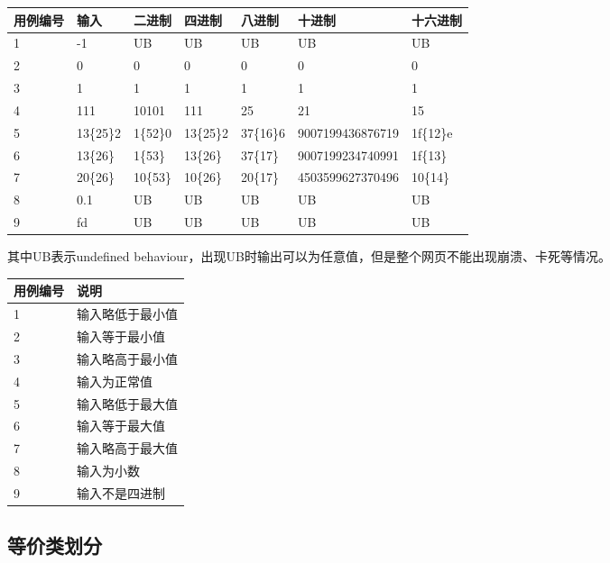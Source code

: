 \documentclass[12pt, a4paper, oneside]{ctexart}
\begin{document}
\begin{table}
\begin{tabular}{|l|l|l|l|l|l|l|}
\hline
用例编号 & 输入 & 二进制 & 四进制 & 八进制 & 十进制 & 十六进制\\ \hline
1 & -1 & UB & UB & UB & UB & UB \\ \hline
2 & 0 & 0 & 0 & 0 & 0 & 0 \\ \hline
3 & 1 & 1 & 1 & 1 & 1 & 1 \\ \hline
4 & 111 & 10101 & 111 & 25 & 21 & 15 \\ \hline
5 & 13\{25\}2 & 1\{52\}0 & 13\{25\}2 & 37\{16\}6 & 9007199436876719 & 1f\{12\}e \\ \hline
6 & 13\{26\} & 1\{53\} & 13\{26\} & 37\{17\}\ &    9007199234740991 & 1f\{13\} \\ \hline
7 & 20\{26\} & 10\{53\} & 10\{26\} & 20\{17\} &    4503599627370496 & 10\{14\}  \\ \hline
8 & 0.1 & UB & UB & UB & UB & UB  \\ \hline
9 & fd & UB & UB & UB & UB & UB  \\ \hline

\end{tabular}
\end{table}
其中UB表示undefined behaviour，出现UB时输出可以为任意值，但是整个网页不能出现崩溃、卡死等情况。
\begin{table}[!h]
    \begin{tabular}{|l|l|}
    \hline
    用例编号 & 说明\\ \hline
    1 & 输入略低于最小值\\ \hline
    2 & 输入等于最小值\\ \hline
    3 & 输入略高于最小值 \\ \hline
    4 & 输入为正常值 \\ \hline   
    5 & 输入略低于最大值\\ \hline
    6 & 输入等于最大值 \\ \hline
    7 & 输入略高于最大值 \\ \hline
    8 & 输入为小数 \\ \hline
    9 & 输入不是四进制 \\ \hline
    \end{tabular}
\end{table}


\newpage

\subsection{等价类划分}
\end{document}
